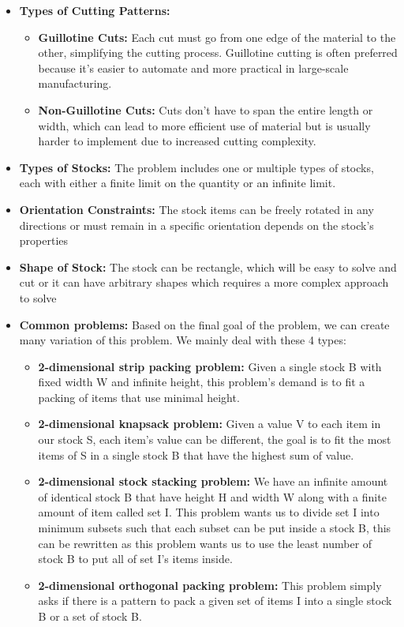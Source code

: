 \documentclass[a4paper]{article}
\begin{document}
\begin{itemize}
    \item \textbf{Types of Cutting Patterns:}
    \begin{itemize}
    \item \textbf{Guillotine Cuts:} Each cut must go from one edge of the material to the other, simplifying the cutting process. Guillotine cutting is often preferred because it's easier to automate and more practical in large-scale manufacturing.
    \item \textbf{Non-Guillotine Cuts:} Cuts don’t have to span the entire length or width, which can lead to more efficient use of material but is usually harder to implement due to increased cutting complexity.
\end{itemize}
\item \textbf{Types of Stocks:}
The problem includes one or multiple types of stocks, each with either a finite limit on the quantity or an infinite limit.
\item \textbf{Orientation Constraints:}
The stock items can be freely rotated in any directions or must remain in a specific orientation depends on the stock's properties
\item \textbf{Shape of Stock:} The stock can be rectangle, which will be easy to solve and cut or it can have arbitrary shapes which requires a more complex approach to solve

\item \textbf{Common problems:} Based on the final goal of the problem, we can create many variation of this problem. We mainly deal with these 4 types:
\begin{itemize}
    \item \textbf{2-dimensional strip packing problem:} Given a single stock B with fixed width W and infinite height, this problem's demand is to fit a packing of items that use minimal height.
    \item \textbf{2-dimensional knapsack problem:} Given a value V to each item in our stock S, each item's value can be different, the goal is to fit the most items of S in a single stock B that have the highest sum of value.
    \item \textbf{2-dimensional stock stacking problem:} We have an infinite amount of identical stock B that have height H and width W along with a finite amount of item called set I. This problem wants us to divide set I into minimum subsets such that each subset can be put inside a stock B, this can be rewritten as this problem wants us to use the least number of stock B to put all of set I's items inside.
    \item \textbf{2-dimensional orthogonal packing problem:} This problem simply asks if there is a pattern to pack a given set of items I into a single stock B or a set of stock B. 
\end{itemize}

\end{itemize}
\end{document}
